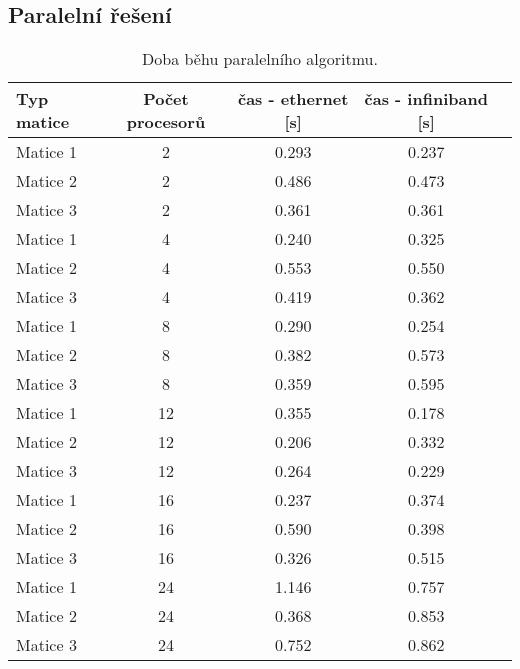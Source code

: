 \documentclass[12pt]{article}
\begin{document}
\subsection{Paralelní řešení}
\begin{table}[ht]
\centering
\begin{tabular}{|l|c|c|c|c|}
\hline \textbf{Typ matice} & \textbf{Počet procesorů} & \textbf{čas - ethernet [s]} & \textbf{čas - infiniband [s]} \\
\hline 
\hline Matice 1 & 2 & 0.293 & 0.237 \\ 
\hline Matice 2 & 2 & 0.486 & 0.473 \\ 
\hline Matice 3 & 2 & 0.361 & 0.361 \\ 
\hline
\hline Matice 1 & 4 & 0.240 & 0.325 \\ 
\hline Matice 2 & 4 & 0.553 & 0.550 \\ 
\hline Matice 3 & 4 & 0.419 & 0.362 \\ 
\hline 
\hline Matice 1 & 8 & 0.290 & 0.254 \\ 
\hline Matice 2 & 8 & 0.382 & 0.573 \\ 
\hline Matice 3 & 8 & 0.359 & 0.595 \\ 
\hline 
\hline Matice 1 & 12 & 0.355 & 0.178 \\ 
\hline Matice 2 & 12 & 0.206 & 0.332 \\ 
\hline Matice 3 & 12 & 0.264 & 0.229 \\ 
\hline 
\hline Matice 1 & 16 & 0.237 & 0.374 \\ 
\hline Matice 2 & 16 & 0.590 & 0.398 \\ 
\hline Matice 3 & 16 & 0.326 & 0.515 \\ 
\hline 
\hline Matice 1 & 24 & 1.146 & 0.757 \\ 
\hline Matice 2 & 24 & 0.368 & 0.853 \\ 
\hline Matice 3 & 24 & 0.752 & 0.862 \\ 
\hline 
\end{tabular}
\caption{Doba běhu paralelního algoritmu.}
\label{doba_behu_paralelne}	
\end{table}
\end{document}
